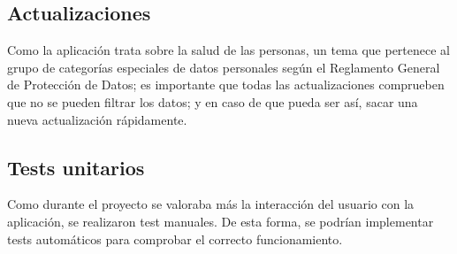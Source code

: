 \subsection{Actualizaciones}

Como la aplicación trata sobre la salud de las personas, un tema que pertenece al grupo de categorías especiales de datos personales según el Reglamento General de Protección de Datos; es importante que todas las actualizaciones comprueben que no se pueden filtrar los datos; y en caso de que pueda ser así, sacar una nueva actualización rápidamente.

\subsection{Tests unitarios}

Como durante el proyecto se valoraba más la interacción del usuario con la aplicación, se realizaron test manuales. De esta forma, se podrían implementar tests automáticos para comprobar el correcto funcionamiento.